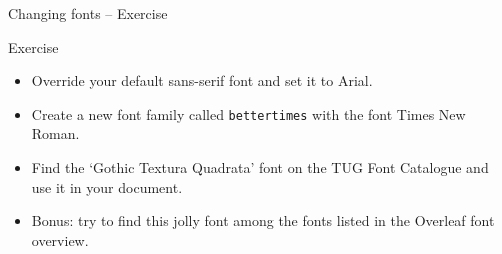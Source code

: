 \documentclass{beamer}
\newcommand{\code}[1]{\texttt{#1}}
\newcommand{\command}[2]{\texttt{\textbackslash#1\{#2\}}}
\begin{document}
\begin{frame}{Changing fonts -- Exercise}
    \begin{block}{Exercise}
        \begin{itemize}
            \item Override your default sans-serif font and set it to {\arial{}Arial}.
            \item Create a new font family called \texttt{bettertimes} with the font {\bettertimes{}Times New Roman}.
            \item Find the `Gothic Textura Quadrata' font on the TUG Font Catalogue and use it in your document.
            \item {\minya Bonus: try to find this jolly font among the fonts listed in the Overleaf font overview.}
        \end{itemize}
    \end{block}
\end{frame}








\end{document}
